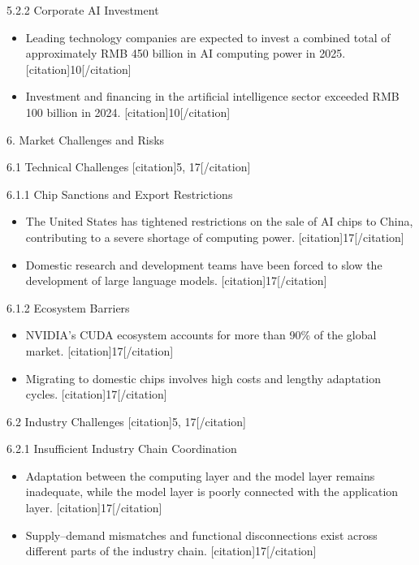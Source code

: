 \documentclass{huawei}
\begin{document}
\begin{tcolorbox}[
    title={Example of Hierarchical Research Outline},
    colback=gray!5,
    colframe=gray!40,
    fonttitle=\bfseries,
    boxrule=0.5pt,
    arc=2pt,
    breakable
]
\textcolor{TitleRed}{5.2.2 Corporate AI Investment}
\begin{itemize}[leftmargin=1em, listparindent=\parindent]
\item Leading technology companies are expected to invest a combined total of approximately RMB 450 billion in AI computing power in 2025. [citation]10[/citation]
\item Investment and financing in the artificial intelligence sector exceeded RMB 100 billion in 2024. [citation]10[/citation]
\end{itemize}

\textcolor{TitleRed}{6. Market Challenges and Risks}

\textcolor{TitleRed}{6.1 Technical Challenges [citation]5, 17[/citation]}

\textcolor{TitleRed}{6.1.1 Chip Sanctions and Export Restrictions}
\begin{itemize}[leftmargin=1em, listparindent=\parindent]
\item The United States has tightened restrictions on the sale of AI chips to China, contributing to a severe shortage of computing power. [citation]17[/citation]
\item Domestic research and development teams have been forced to slow the development of large language models. [citation]17[/citation]
\end{itemize}

\textcolor{TitleRed}{6.1.2 Ecosystem Barriers}
\begin{itemize}[leftmargin=1em, listparindent=\parindent]
\item NVIDIA’s CUDA ecosystem accounts for more than 90\% of the global market. [citation]17[/citation]
\item Migrating to domestic chips involves high costs and lengthy adaptation cycles. [citation]17[/citation]
\end{itemize}

\textcolor{TitleRed}{6.2 Industry Challenges [citation]5, 17[/citation]}

\textcolor{TitleRed}{6.2.1 Insufficient Industry Chain Coordination}
\begin{itemize}[leftmargin=1em, listparindent=\parindent]
\item Adaptation between the computing layer and the model layer remains inadequate, while the model layer is poorly connected with the application layer. [citation]17[/citation]
\item Supply–demand mismatches and functional disconnections exist across different parts of the industry chain. [citation]17[/citation]
\end{itemize}


\end{tcolorbox}
\end{document}

